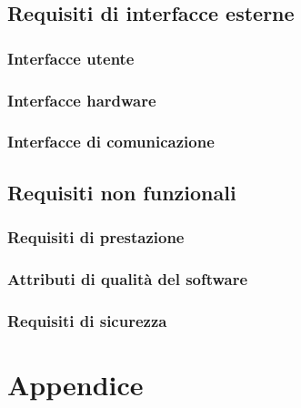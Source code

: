 \documentclass{report}
\begin{document}
\section{Requisiti di interfacce esterne}

\subsection{Interfacce utente}
\subsection{Interfacce hardware}
\subsection{Interfacce di comunicazione}
\section{Requisiti non funzionali}
\subsection{Requisiti di prestazione}
\subsection{Attributi di qualità del software}
\subsection{Requisiti di sicurezza}

\chapter{Appendice}
\end{document}
